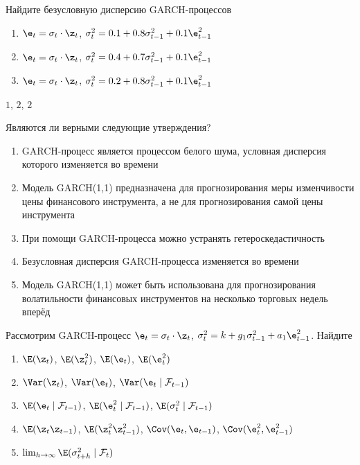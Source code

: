 \begin{solution}
\end{solution}


\begin{problem}
Найдите безусловную дисперсию GARCH-процессов 
\begin{enumerate}
\item $\e_t=\sigma_t \cdot \z_t$, $\sigma^2_t=0.1+0.8\sigma^2_{t-1}+0.1\e^2_{t-1}$
\item $\e_t=\sigma_t \cdot \z_t$, $\sigma^2_t=0.4+0.7\sigma^2_{t-1}+0.1\e^2_{t-1}$
\item $\e_t=\sigma_t \cdot \z_t$, $\sigma^2_t=0.2+0.8\sigma^2_{t-1}+0.1\e^2_{t-1}$
\end{enumerate}
\end{problem}

\begin{solution}
$1$, $2$, $2$ 
\end{solution}


\begin{problem}
Являются ли верными следующие утверждения?
\begin{enumerate}
\item GARCH-процесс является процессом белого шума, условная дисперсия которого
изменяется во времени
\item Модель GARCH(1,1) предназначена для прогнозирования меры изменчивости цены
финансового инструмента, а не для прогнозирования самой цены инструмента
\item При помощи GARCH-процесса можно устранять гетероскедастичность
\item Безусловная дисперсия GARCH-процесса изменяется во времени
\item Модель GARCH(1,1) может быть использована для прогнозирования
волатильности финансовых инструментов на несколько торговых недель вперёд     
\end{enumerate}
\end{problem}

\begin{solution}
\end{solution}


\begin{problem}
Рассмотрим GARCH-процесс $\e_t=\sigma_t \cdot \z_t$, $\sigma^2_t=k+g_1\sigma^2_{t-1}+a_1\e^2_{t-1}$. Найдите
\begin{enumerate}
\item $\E(\z_t)$, $\E(\z_t^2)$, $\E(\e_t)$, $\E(\e_t^2)$
\item $\Var(\z_t)$, $\Var(\e_t)$, $\Var(\e_t \mid \mathcal{F}_{t-1})$
\item $\E(\e_t \mid \mathcal{F}_{t-1})$, $\E(\e_t^2 \mid \mathcal{F}_{t-1})$, $\E(\sigma^2_t \mid \mathcal{F}_{t-1})$
\item $\E(\z_t\z_{t-1})$, $\E(\z_t^2\z_{t-1}^2)$, $\Cov(\e_t,\e_{t-1})$, $\Cov(\e_t^2,\e_{t-1}^2)$
\item $\lim_{h\to\infty} \E(\sigma^2_{t+h} \mid \mathcal{F}_t)$
\end{enumerate}
\end{problem}

